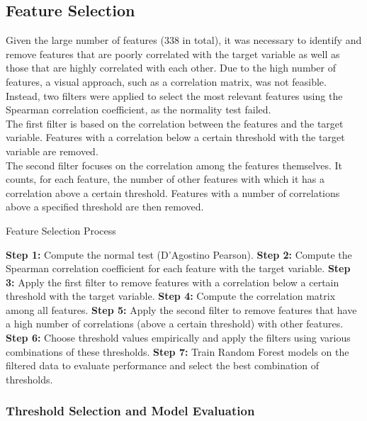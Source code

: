 \subsection{Feature Selection}
Given the large number of features (338 in total), it was necessary to identify and remove features that are poorly correlated with
the target variable as well as those that are highly correlated with each other. Due to the high number of features, a visual approach,
such as a correlation matrix, was not feasible. Instead, two filters were applied to select the most
relevant features using the Spearman correlation coefficient, as the normality test failed.\\
The first filter is based on the correlation between the features and the target variable. Features with a correlation below a certain
threshold with the target variable are removed.\\
The second filter focuses on the correlation among the features themselves.
It counts, for each feature, the number of other features with which it has a correlation above a certain threshold. Features with a
number of correlations above a specified threshold are then removed.\\

\begin{algorithm}[h]
    \caption{Feature Selection Process}
    \begin{algorithmic}[1]
        \State \textbf{Step 1:} Compute  the normal test (D'Agostino Pearson).
        \State \textbf{Step 2:} Compute the Spearman correlation coefficient for each feature with the target variable.
        \State \textbf{Step 3:} Apply the first filter to remove features with a correlation below a certain threshold with the target variable.
        \State \textbf{Step 4:} Compute the correlation matrix among all features.
        \State \textbf{Step 5:} Apply the second filter to remove features that have a high number of correlations (above a certain threshold)
        with other features.
        \State \textbf{Step 6:} Choose threshold values empirically and apply the filters using various combinations of these thresholds.
        \State \textbf{Step 7:} Train Random Forest models on the filtered data to evaluate performance and select the best combination of thresholds.
    \end{algorithmic}
\end{algorithm}

\subsubsection*{Threshold Selection and Model Evaluation}

